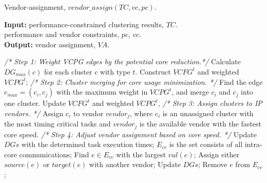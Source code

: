 \documentclass[10pt,journal, compsoc]{IEEEtran}
\begin{document}
\begin{algorithm}[!h]
\caption{Vendor-assignment, $vendor\_assign(TC, vc, pc)$.}
\label{alg:VA}
{\textbf{Input:}}
performance-constrained clustering results, $TC$.\\
\hspace*{2.4em} performance and vendor constraints, $pc$, $vc$.\\
{\textbf{Output:}} vendor assignment, $VA$.
\begin{algorithmic}[1]
\STATEx \hspace*{-\algorithmicindent}\textit{/* Step 1: Weight VCPG edges by the potential core reduction.*/}
\STATE Calculate $DG_{max}(c)$ for each cluster $c$ with type $t$.
\STATE Construct $VCFG^t$ and weighted $VCPG^t$;
\STATEx \hspace*{-\algorithmicindent}\textit{/* Step 2: Cluster merging for core usage minimization. */}
\STATE Find the edge $e_{max}=(c_i,c_j)$ with the maximum weight in $VCPG^t$, and merge $c_i$ and $c_j$ into one cluster.
\STATE Update $VCFG^t$ and weighted $VCPG^t$,
\ENDWHILE
\STATEx \hspace*{-\algorithmicindent}\textit{/* Step 3: Assign clusters to IP vendors. */}
    \STATE Assign $c_i$ to vendor $vendor_j$, where $c_i$ is an unassigned cluster with the most timing critical tasks and $vendor_j$ is the available vendor with the fastest core speed.
\ENDWHILE
\ENDFOR
\STATEx \hspace*{-\algorithmicindent}\textit{/* Step 4: Adjust vendor assignment based on core speed. */}
\STATE Update $DGs$ with the determined task execution times;
\STATE $E_{cv}$ is the set consists of all intra-core communications;
\STATE Find $e\in E_{cv}$ with the largest $vul(e)$;
\STATE Assign either $source(e)$ or $target(e)$ with another vendor;
\STATE Update $DGs$;
\ENDIF
\STATE Remove $e$ from $E_{cv}$;
\ENDWHILE
\end{algorithmic}
\end{algorithm}
\end{document}
